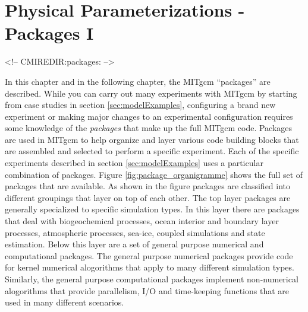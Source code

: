 
\chapter{Physical Parameterizations - Packages I}
\label{chap:packagesI}

\begin{rawhtml}
<!-- CMIREDIR:packages: -->
\end{rawhtml}

In this chapter and in the following chapter, the MITgcm ``packages'' are 
described. While you can carry out many experiments with MITgcm by starting 
from case studies in section \ref{sec:modelExamples}, configuring
a brand new experiment or making major changes to an experimental configuration
requires some knowledge of the {\it packages}
that make up the full MITgcm code. Packages are used in MITgcm to
help organize and layer various code building blocks that are assembled 
and selected to perform a specific experiment. Each of the specific experiments
described in section \ref{sec:modelExamples} uses a particular combination
of packages.
Figure \ref{fig:package_organigramme} shows the full set of packages that
are available. As shown in the figure packages are classified into different 
groupings that layer on top of each other. The top layer packages are 
generally specialized to specific simulation types. In this layer there are
packages that deal with biogeochemical processes, ocean interior
and boundary layer processes, atmospheric processes, sea-ice, coupled 
simulations and state estimation.
Below this layer are a set of general purpose
numerical and computational packages. The general purpose numerical packages
provide code for kernel numerical alogorithms
that apply to
many different simulation types. Similarly, the general purpose computational 
packages implement non-numerical alogorithms that provide parallelism,
I/O and time-keeping functions that are used in many different scenarios.


